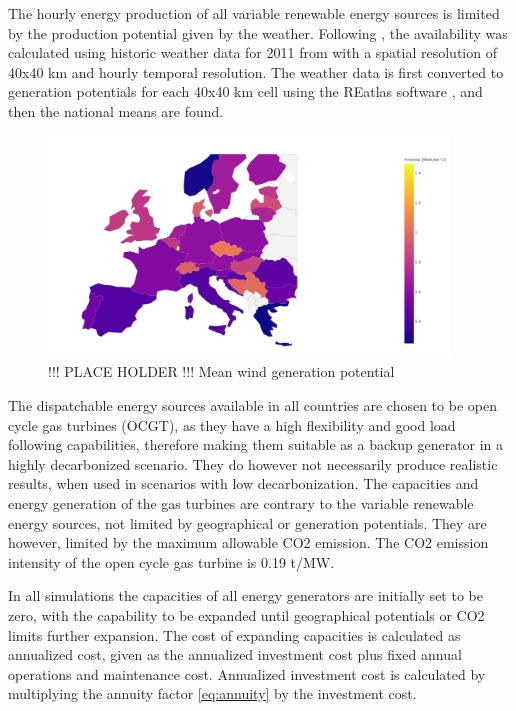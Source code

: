 The hourly energy production of all variable renewable energy sources is limited by the production potential given by the weather. Following \cite{PyPSA_euro_30_model}, the availability was calculated using historic weather data for 2011 from \cite{ClimateForecastSystem} with a spatial resolution of 40x40 km and hourly temporal resolution. The weather data is first converted to generation potentials for each 40x40 km cell using the REatlas software \cite{ANDRESEN20151074}, and then the national means are found. 


\begin{figure}[H]\centering
	\includegraphics[width=0.95\textwidth]{./Images/geographical_potential}
	\caption{!!! PLACE HOLDER !!! Mean wind generation potential}
	\label{fig:generation_potential}
\end{figure}

The dispatchable energy sources available in all countries are chosen to be open cycle gas turbines (OCGT), as they have a high flexibility and good load following capabilities, therefore making them suitable as a backup generator in a highly decarbonized scenario. They do however not necessarily produce realistic results, when used in scenarios with low decarbonization. The capacities and energy generation of the gas turbines are contrary to the variable renewable energy sources, not limited by geographical or generation potentials. They are however, limited by the maximum allowable CO2 emission. The CO2 emission intensity of the open cycle gas turbine is 0.19 t/MW.


In all simulations the capacities of all energy generators are initially set to be zero, with the capability to be expanded until geographical potentials or CO2 limits further expansion. The cost of expanding capacities is calculated as annualized cost, given as the annualized investment cost plus fixed annual operations and maintenance cost. Annualized investment cost is calculated by multiplying the annuity factor \ref{eq:annuity} by the investment cost. 

